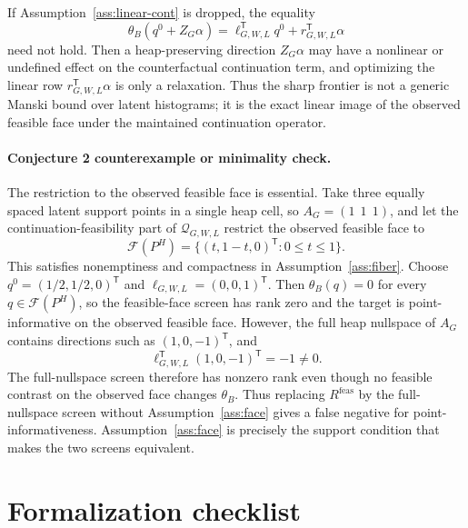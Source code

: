 \documentclass[11pt]{article}
\newcommand{\transpose}{\mathsf{T}}
\theoremstyle{definition}
\theoremstyle{plain}
\theoremstyle{remark}
\begin{document}
If Assumption~\ref{ass:linear-cont} is dropped, the equality
\[
\theta_B(q^0+Z_G\alpha)
=\ell_{G,W,L}^{\transpose}q^0+r_{G,W,L}^{\transpose}\alpha
\]
need not hold.  Then a heap-preserving direction \(Z_G\alpha\) may have a nonlinear or undefined effect on the counterfactual continuation term, and optimizing the linear row \(r_{G,W,L}^{\transpose}\alpha\) is only a relaxation.  Thus the sharp frontier is not a generic Manski bound over latent histograms; it is the exact linear image of the observed feasible face under the maintained continuation operator.

\paragraph{Conjecture 2 counterexample or minimality check.}
The restriction to the observed feasible face is essential.  Take three equally spaced latent support points in a single heap cell, so \(A_G=(1\ \ 1\ \ 1)\), and let the continuation-feasibility part of \(\mathcal{Q}_{G,W,L}\) restrict the observed feasible face to
\[
\mathcal{F}(P^H)=\{(t,1-t,0)^{\transpose}:0\le t\le1\}.
\]
This satisfies nonemptiness and compactness in Assumption~\ref{ass:fiber}.  Choose \(q^0=(1/2,1/2,0)^{\transpose}\) and \(\ell_{G,W,L}=(0,0,1)^{\transpose}\).  Then \(\theta_B(q)=0\) for every \(q\in\mathcal{F}(P^H)\), so the feasible-face screen has rank zero and the target is point-informative on the observed feasible face.  However, the full heap nullspace of \(A_G\) contains directions such as \((1,0,-1)^{\transpose}\), and
\[
\ell_{G,W,L}^{\transpose}(1,0,-1)^{\transpose}=-1\ne0.
\]
The full-nullspace screen therefore has nonzero rank even though no feasible contrast on the observed face changes \(\theta_B\).  Thus replacing \(R^{\mathrm{feas}}\) by the full-nullspace screen without Assumption~\ref{ass:face} gives a false negative for point-informativeness.  Assumption~\ref{ass:face} is precisely the support condition that makes the two screens equivalent.

\section{Formalization checklist}
\end{document}
